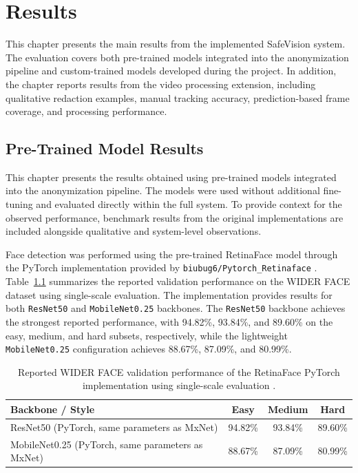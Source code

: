 \chapter{Results}
\label{chap:results}

This chapter presents the main results from the implemented \gls{SafeVision} system. The evaluation covers both pre-trained models integrated into the \gls{anonymization} pipeline and custom-trained models developed during the project. In addition, the chapter reports results from the video processing extension, including qualitative redaction examples, manual tracking accuracy, prediction-based frame coverage, and processing performance.


\section{Pre-Trained Model Results}

This chapter presents the results obtained using pre-trained models integrated into the \gls{anonymization} pipeline. The models were used without additional fine-tuning and evaluated directly within the full system. To provide context for the observed performance, benchmark results from the original implementations are included alongside qualitative and system-level observations.


Face detection was performed using the pre-trained RetinaFace model through the PyTorch implementation provided by \texttt{biubug6/Pytorch\_Retinaface} \cite{biubug6_retinaface}.  Table~\ref{tab:retinaface_widerface} summarizes the reported validation performance on the WIDER FACE dataset using single-scale evaluation. The implementation provides results for both \texttt{ResNet50} and \texttt{MobileNet0.25} backbones. The \texttt{ResNet50} backbone achieves the strongest reported performance, with 94.82\%, 93.84\%, and 89.60\% on the easy, medium, and hard subsets, respectively, while the lightweight \texttt{MobileNet0.25} configuration achieves 88.67\%, 87.09\%, and 80.99\%.

\begin{table}[H]
\centering
\begin{tabular}{lccc}
\toprule
Backbone / Style & Easy & Medium & Hard \\
\midrule
ResNet50 (PyTorch, same parameters as MxNet) & 94.82\% & 93.84\% & 89.60\% \\
MobileNet0.25 (PyTorch, same parameters as MxNet) & 88.67\% & 87.09\% & 80.99\% \\
\bottomrule
\end{tabular}
\caption{Reported WIDER FACE validation performance of the RetinaFace PyTorch implementation using single-scale evaluation \cite{biubug6_retinaface}.}
\label{tab:retinaface_widerface}
\end{table}

